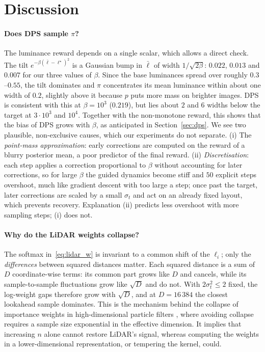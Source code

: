 \documentclass[11pt]{article}
\begin{document}
\section{Discussion}
\label{sec:discussion}

\paragraph{Does DPS sample $\pi$?}
The luminance reward depends on a single scalar, which allows a direct check. The tilt $e^{-\beta(\bar\ell-\ell^\star)^2}$ is a Gaussian bump in $\bar\ell$ of width $1/\sqrt{2\beta}$: $0.022$, $0.013$ and $0.007$ for our three values of $\beta$. Since the base luminances spread over roughly $0.3$--$0.55$, the tilt dominates and $\pi$ concentrates its mean luminance within about one width of $0.2$, slightly above it because $p$ puts more mass on brighter images. DPS is consistent with this at $\beta=10^3$ ($0.219$), but lies about $2$ and $6$ widths below the target at $3\cdot10^3$ and $10^4$. Together with the non-monotone reward, this shows that the bias of DPS grows with $\beta$, as anticipated in Section~\ref{sec:dps}. We see two plausible, non-exclusive causes, which our experiments do not separate. (i) The \emph{point-mass approximation}: early corrections are computed on the reward of a blurry posterior mean, a poor predictor of the final reward. (ii) \emph{Discretisation}: each step applies a correction proportional to $\beta$ without accounting for later corrections, so for large $\beta$ the guided dynamics become stiff and $50$ explicit steps overshoot, much like gradient descent with too large a step; once past the target, later corrections are scaled by a small $\sigma_t$ and act on an already fixed layout, which prevents recovery. Explanation (ii) predicts less overshoot with more sampling steps; (i) does not.

\paragraph{Why do the LiDAR weights collapse?}
The softmax in~\eqref{eq:lidar_w} is invariant to a common shift of the $\ell_i$; only the \emph{differences} between squared distances matter. Each squared distance is a sum of $D$ coordinate-wise terms: its common part grows like $D$ and cancels, while its sample-to-sample fluctuations grow like $\sqrt{D}$ and do not. With $2\sigma_t^2\leq2$ fixed, the log-weight gaps therefore grow with $\sqrt{D}$, and at $D=16\,384$ the closest lookahead sample dominates. This is the mechanism behind the collapse of importance weights in high-dimensional particle filters \citep{bengtsson2008curse, snyder2008obstacles}, where avoiding collapse requires a sample size exponential in the effective dimension. It implies that increasing $n$ alone cannot restore LiDAR's signal, whereas computing the weights in a lower-dimensional representation, or tempering the kernel, could.
\end{document}
